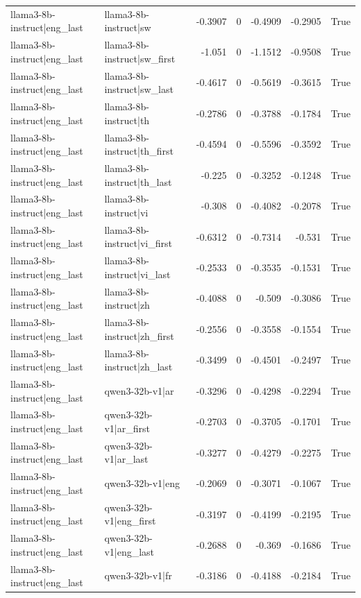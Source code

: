 \begin{table}
\begin{tabular}{l l r r r r l}
llama3-8b-instruct|eng_last & llama3-8b-instruct|sw & -0.3907 & 0 & -0.4909 & -0.2905 & True \\
llama3-8b-instruct|eng_last & llama3-8b-instruct|sw_first & -1.051 & 0 & -1.1512 & -0.9508 & True \\
llama3-8b-instruct|eng_last & llama3-8b-instruct|sw_last & -0.4617 & 0 & -0.5619 & -0.3615 & True \\
llama3-8b-instruct|eng_last & llama3-8b-instruct|th & -0.2786 & 0 & -0.3788 & -0.1784 & True \\
llama3-8b-instruct|eng_last & llama3-8b-instruct|th_first & -0.4594 & 0 & -0.5596 & -0.3592 & True \\
llama3-8b-instruct|eng_last & llama3-8b-instruct|th_last & -0.225 & 0 & -0.3252 & -0.1248 & True \\
llama3-8b-instruct|eng_last & llama3-8b-instruct|vi & -0.308 & 0 & -0.4082 & -0.2078 & True \\
llama3-8b-instruct|eng_last & llama3-8b-instruct|vi_first & -0.6312 & 0 & -0.7314 & -0.531 & True \\
llama3-8b-instruct|eng_last & llama3-8b-instruct|vi_last & -0.2533 & 0 & -0.3535 & -0.1531 & True \\
llama3-8b-instruct|eng_last & llama3-8b-instruct|zh & -0.4088 & 0 & -0.509 & -0.3086 & True \\
llama3-8b-instruct|eng_last & llama3-8b-instruct|zh_first & -0.2556 & 0 & -0.3558 & -0.1554 & True \\
llama3-8b-instruct|eng_last & llama3-8b-instruct|zh_last & -0.3499 & 0 & -0.4501 & -0.2497 & True \\
llama3-8b-instruct|eng_last & qwen3-32b-v1|ar & -0.3296 & 0 & -0.4298 & -0.2294 & True \\
llama3-8b-instruct|eng_last & qwen3-32b-v1|ar_first & -0.2703 & 0 & -0.3705 & -0.1701 & True \\
llama3-8b-instruct|eng_last & qwen3-32b-v1|ar_last & -0.3277 & 0 & -0.4279 & -0.2275 & True \\
llama3-8b-instruct|eng_last & qwen3-32b-v1|eng & -0.2069 & 0 & -0.3071 & -0.1067 & True \\
llama3-8b-instruct|eng_last & qwen3-32b-v1|eng_first & -0.3197 & 0 & -0.4199 & -0.2195 & True \\
llama3-8b-instruct|eng_last & qwen3-32b-v1|eng_last & -0.2688 & 0 & -0.369 & -0.1686 & True \\
llama3-8b-instruct|eng_last & qwen3-32b-v1|fr & -0.3186 & 0 & -0.4188 & -0.2184 & True \\

\end{tabular}
\end{table}
